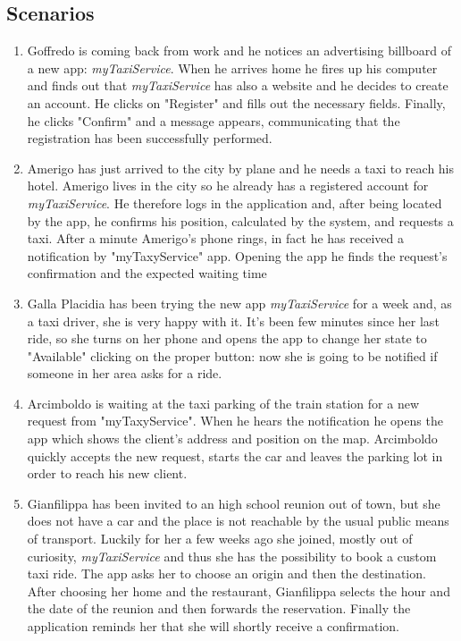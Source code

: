 \documentclass[a4paper]{article}
\begin{document}
\subsection{Scenarios}
    \begin{enumerate}[label=\bfseries S\arabic*:]
        \item Goffredo is coming back from work and he notices an advertising billboard of a new app: \emph{myTaxiService}. When he arrives home he fires up his computer and finds out that \emph{myTaxiService} has also a website and he decides to create an account. He clicks on "Register" and fills out the necessary fields. Finally, he clicks "Confirm" and a message appears, communicating that the registration has been successfully performed.
        \item Amerigo has just arrived to the city by plane and he needs a taxi to reach his hotel. Amerigo lives in the city so he already has a registered account for \emph{myTaxiService}. He therefore logs in the application and, after being located by the app, he confirms his position, calculated by the system, and requests a taxi. After a minute Amerigo's phone rings, in fact he has received a notification by "myTaxyService" app. Opening the app he finds the request's confirmation and the expected waiting time
        \item Galla Placidia has been trying the new app \emph{myTaxiService} for a week and, as a taxi driver, she is very happy with it. It's been few minutes since her last ride, so she turns on her phone and opens the app to change her state to "Available" clicking on the proper button: now she is going to be notified if someone in her area asks for a ride.
        \item Arcimboldo is waiting at the taxi parking of the train station for a new request from "myTaxyService". When he hears the notification he opens the app which shows the client's address and position on the map. Arcimboldo quickly accepts the new request, starts the car and leaves the parking lot in order to reach his new client. 
        \item Gianfilippa has been invited to an high school reunion out of town, but she does not have a car and the place is not reachable by the usual public means of transport. Luckily for her a few weeks ago she joined, mostly out of curiosity, \emph{myTaxiService} and thus she has the possibility to book a custom taxi ride. The app asks her to choose an origin and then the destination. After choosing her home and the restaurant, Gianfilippa selects the hour and the date of the reunion and then forwards the reservation. Finally the application reminds her that she will shortly receive a confirmation.
    \end{enumerate}
    
\end{document}
